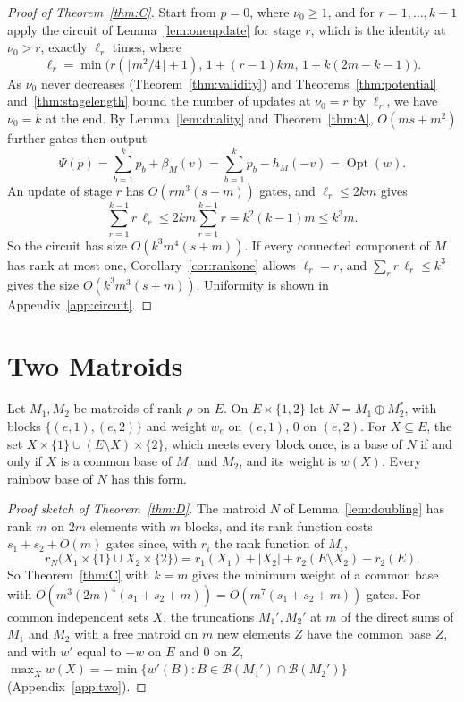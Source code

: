 \documentclass[runningheads,envcountsame]{llncs}
\newcommand{\Opt}{\operatorname{Opt}}
\newcommand{\Bases}{\mathcal B}
\begin{document}
\begin{proof}[Proof of Theorem~\ref{thm:C}]
Start from $p=0$, where $\nu_0\ge1$, and for $r=1,\ldots,k-1$ apply the circuit of
Lemma~\ref{lem:oneupdate} for stage $r$, which is the identity at $\nu_0>r$,
exactly $\ell_r$ times, where
\[
  \ell_r=\min\bigl(r(\lfloor m^{2}/4\rfloor+1),\,1+(r-1)km,\,1+k(2m-k-1)\bigr).
\]  As $\nu_0$ never decreases
(Theorem~\ref{thm:validity}) and Theorems~\ref{thm:potential}
and~\ref{thm:stagelength} bound the number of updates at $\nu_0=r$ by $\ell_r$,
we have $\nu_0=k$ at the end.  By Lemma~\ref{lem:duality} and
Theorem~\ref{thm:A}, $O(ms+m^{2})$ further gates then output
\[
  \Psi(p)=\sum_{b=1}^{k}p_b+\beta_M(v)=\sum_{b=1}^{k}p_b-h_M(-v)=\Opt(w).
\]
An update of stage $r$ has $O(rm^{3}(s+m))$ gates, and $\ell_r\le2km$ gives
\[
  \sum_{r=1}^{k-1}r\,\ell_r\le2km\sum_{r=1}^{k-1}r=k^{2}(k-1)m\le k^{3}m.
\]
So the circuit has size $O(k^{3}m^{4}(s+m))$.  If every connected component of $M$ has
rank at most one, Corollary~\ref{cor:rankone} allows $\ell_r=r$, and
$\sum_rr\,\ell_r\le k^{3}$ gives the size $O(k^{3}m^{3}(s+m))$.  Uniformity is
shown in Appendix~\ref{app:circuit}.
\end{proof}

\section{Two Matroids}
\label{sec:two}

\begin{lemma}
\label{lem:doubling}
Let $M_1,M_2$ be matroids of rank $\rho$ on $E$.  On $E\times\{1,2\}$ let
$N=M_1\oplus M_2^{*}$, with blocks $\{(e,1),(e,2)\}$ and weight $w_e$ on $(e,1)$,
$0$ on $(e,2)$.  For $X\subseteq E$, the set $X\times\{1\}\cup(E\setminus X)\times\{2\}$,
which meets every block once, is a base of $N$ if and only if $X$ is a common base
of $M_1$ and $M_2$, and its weight is $w(X)$.  Every rainbow base of $N$ has this
form.
\end{lemma}

\begin{proof}[Proof sketch of Theorem~\ref{thm:D}]
The matroid $N$ of Lemma~\ref{lem:doubling} has rank $m$ on $2m$ elements with
$m$ blocks, and its rank function costs $s_1+s_2+O(m)$ gates since, with $r_i$
the rank function of $M_i$,
\[
  r_N\bigl(X_1\times\{1\}\cup X_2\times\{2\}\bigr)=r_1(X_1)+|X_2|+r_2(E\setminus X_2)-r_2(E).
\]
So Theorem~\ref{thm:C} with $k=m$ gives the minimum
weight of a common base with $O(m^{3}(2m)^{4}(s_1+s_2+m))=O(m^{7}(s_1+s_2+m))$
gates.  For common independent sets $X$, the truncations $M_1',M_2'$ at $m$ of the
direct sums of $M_1$ and $M_2$ with a free matroid on $m$ new elements $Z$ have the
common base $Z$, and with $w'$ equal to $-w$ on $E$ and $0$ on $Z$,
$\max_Xw(X)=-\min\{w'(B):B\in\Bases(M_1')\cap\Bases(M_2')\}$
(Appendix~\ref{app:two}).
\end{proof}
\end{document}
